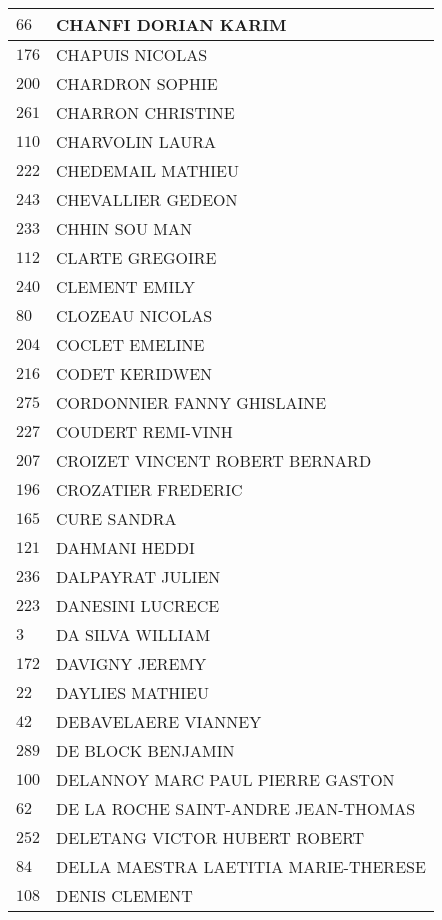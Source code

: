 \begin{xltabular}{\linewidth}{|l|X|}
    \hline
    $66$ & CHANFI DORIAN KARIM \\
    \hline
    $176$ & CHAPUIS NICOLAS \\
    \hline
    $200$ & CHARDRON SOPHIE \\
    \hline
    $261$ & CHARRON CHRISTINE \\
    \hline
    $110$ & CHARVOLIN LAURA \\
    \hline
    $222$ & CHEDEMAIL MATHIEU \\
    \hline
    $243$ & CHEVALLIER GEDEON \\
    \hline
    $233$ & CHHIN SOU MAN \\
    \hline
    $112$ & CLARTE GREGOIRE \\
    \hline
    $240$ & CLEMENT EMILY \\
    \hline
    $80$ & CLOZEAU NICOLAS \\
    \hline
    $204$ & COCLET EMELINE \\
    \hline
    $216$ & CODET KERIDWEN \\
    \hline
    $275$ & CORDONNIER FANNY GHISLAINE \\
    \hline
    $227$ & COUDERT REMI-VINH \\
    \hline
    $207$ & CROIZET VINCENT ROBERT BERNARD \\
    \hline
    $196$ & CROZATIER FREDERIC \\
    \hline
    $165$ & CURE SANDRA \\
    \hline
    $121$ & DAHMANI HEDDI \\
    \hline
    $236$ & DALPAYRAT JULIEN \\
    \hline
    $223$ & DANESINI LUCRECE \\
    \hline
    $3$ & DA SILVA WILLIAM \\
    \hline
    $172$ & DAVIGNY JEREMY \\
    \hline
    $22$ & DAYLIES MATHIEU \\
    \hline
    $42$ & DEBAVELAERE VIANNEY \\
    \hline
    $289$ & DE BLOCK BENJAMIN \\
    \hline
    $100$ & DELANNOY MARC PAUL PIERRE GASTON \\
    \hline
    $62$ & DE LA ROCHE SAINT-ANDRE JEAN-THOMAS \\
    \hline
    $252$ & DELETANG VICTOR HUBERT ROBERT \\
    \hline
    $84$ & DELLA MAESTRA LAETITIA MARIE-THERESE \\
    \hline
    $108$ & DENIS CLEMENT \\

\end{xltabular}
